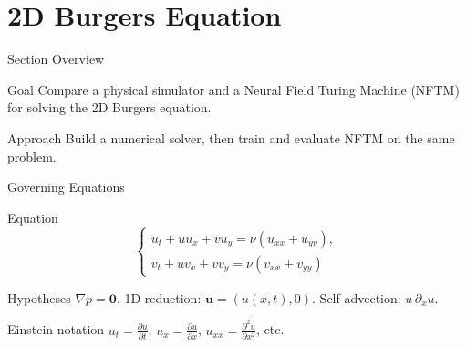 \section{2D Burgers Equation}

\begin{secframe}
\small
\textcolor{red_unipd}{\Large Section Overview}

\begin{alertblock}{Goal}
    Compare a physical simulator and a Neural Field Turing Machine (NFTM) for solving the 2D Burgers equation.

\end{alertblock}

\begin{block}{Approach}
Build a numerical solver, then train and evaluate NFTM on the same problem.
\end{block}
\end{secframe}

\begin{secframe}
\small
\textcolor{red_unipd}{\Large Governing Equations}

\vspace{0.6em}

\begin{alertblock}{Equation}
\[
\begin{cases}
  u_t + u u_x + v u_y = \nu (u_{xx} + u_{yy}), \\
  v_t + u v_x + v v_y = \nu (v_{xx} + v_{yy})
\end{cases}
\]
\end{alertblock}

\vfill

\begin{block}{Hypotheses}
\(\nabla p=\mathbf{0}\). \quad
1D reduction: \(\mathbf{u}=(u(x,t),0)\). \quad
Self-advection: \(u\,\partial_x u\).
\end{block}

\vspace{0.5em}

\begin{block}{Einstein notation}
$u_t = \frac{\partial u}{\partial t}$, $u_x = \frac{\partial u}{\partial x}$, $u_{xx} = \frac{\partial^2 u}{\partial x^2}$, etc.
\end{block}

\end{secframe}


